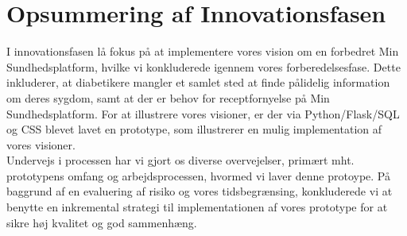 \section{Opsummering af Innovationsfasen} 
I innovationsfasen lå  fokus på at implementere vores vision om en forbedret Min Sundhedsplatform, hvilke vi konkluderede igennem vores forberedelsesfase. Dette inkluderer, at diabetikere mangler et samlet sted at finde pålidelig information om deres sygdom, samt at der er behov for receptfornyelse på Min Sundhedsplatform. For at illustrere vores visioner, er der via Python/Flask/SQL og CSS blevet lavet en prototype, som illustrerer en mulig implementation af vores visioner.\\
Undervejs i processen har vi gjort os diverse overvejelser, primært mht. prototypens omfang og arbejdsprocessen, hvormed vi laver denne protoype. På baggrund af en evaluering af risiko og vores tidsbegrænsing, konkluderede vi at benytte en inkremental strategi til implementationen af vores prototype for at sikre høj kvalitet og god sammenhæng. 
